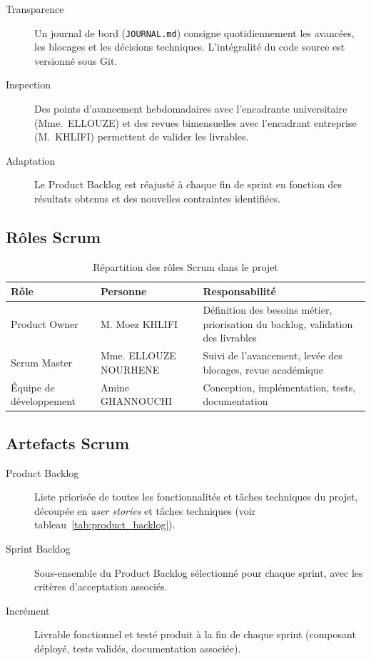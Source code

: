 \begin{description}
  \item[Transparence] Un journal de bord (\texttt{JOURNAL.md}) consigne quotidiennement les avancées, les blocages et les décisions techniques. L'intégralité du code source est versionné sous Git.
  \item[Inspection] Des points d'avancement hebdomadaires avec l'encadrante universitaire (Mme.~ELLOUZE) et des revues bimensuelles avec l'encadrant entreprise (M.~KHLIFI) permettent de valider les livrables.
  \item[Adaptation] Le Product Backlog est réajusté à chaque fin de sprint en fonction des résultats obtenus et des nouvelles contraintes identifiées.
\end{description}

\subsection{Rôles Scrum}

\begin{table}[H]
\centering
\caption{Répartition des rôles Scrum dans le projet}
\label{tab:roles_scrum}
\begin{tabular}{llp{6.5cm}}
\toprule
\textbf{Rôle} & \textbf{Personne} & \textbf{Responsabilité} \\
\midrule
Product Owner & M. Moez KHLIFI & Définition des besoins métier, priorisation du backlog, validation des livrables \\
Scrum Master & Mme. ELLOUZE NOURHENE & Suivi de l'avancement, levée des blocages, revue académique \\
Équipe de développement & Amine GHANNOUCHI & Conception, implémentation, tests, documentation \\
\bottomrule
\end{tabular}
\end{table}

\subsection{Artefacts Scrum}

\begin{description}
  \item[Product Backlog] Liste priorisée de toutes les fonctionnalités et tâches techniques du projet, découpée en \textit{user stories} et tâches techniques (voir tableau~\ref{tab:product_backlog}).
  \item[Sprint Backlog] Sous-ensemble du Product Backlog sélectionné pour chaque sprint, avec les critères d'acceptation associés.
  \item[Incrément] Livrable fonctionnel et testé produit à la fin de chaque sprint (composant déployé, tests validés, documentation associée).
\end{description}

